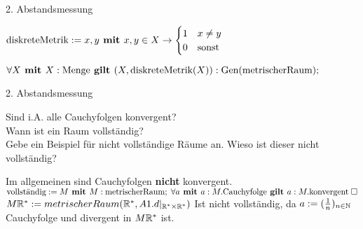 \documentclass{article}
\begin{document}
\begin{flashcard}{2. Abstandsmessung}



  \backside

  $\text{diskreteMetrik} := x,y \textbf{ \textup{mit} \allowbreak} x,y \in X \rightarrow
    \begin{cases}
    1 & x \neq y \\
    0 & \text{sonst}
  \end{cases}
$

$\forall X \textbf{ \textup{mit} \allowbreak} X : \text{Menge} \textbf{ \textup{gilt} \allowbreak} (X, \text{diskreteMetrik}(X)) : \text{Gen}(\text{metrischerRaum});$
\end{flashcard}


\begin{flashcard}{2. Abstandsmessung}

\begin{center}
  Sind i.A. alle Cauchyfolgen konvergent?\\
  Wann ist ein Raum vollständig?\\
  Gebe ein Beispiel für nicht vollständige Räume an. Wieso ist dieser nicht vollständig?
\end{center}


  \backside

  Im allgemeinen sind Cauchyfolgen \textbf{nicht} konvergent.\\
  $\text{vollständig} := M \textbf{ \textup{mit} \allowbreak} M:\text{metrischerRaum}; \; \forall a \textbf{ \textup{mit} \allowbreak}
  a:M.\text{Cauchyfolge} \textbf{ \textup{gilt} \allowbreak} a:M.\text{konvergent} \; \Box$
  $M\mathbb{R}^{*} := metrischerRaum(\mathbb{R}^{*}, A1.d|_{\mathbb{R}^{*} \times \mathbb{R}^{*}})$
  Ist nicht vollständig, da $a := (\frac{1}{n})_{n \in \mathbb{N}}$ Cauchyfolge und divergent in
  $M\mathbb{R}^{*}$ ist.
  \end{flashcard}
\end{document}
